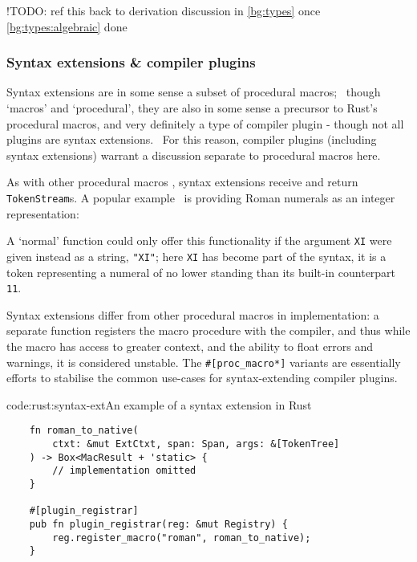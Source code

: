 !TODO: ref this back to derivation discussion in \cref{bg:types} once \cref{bg:types:algebraic} done

\subsubsection{Syntax extensions \& compiler plugins} \label{bg:rust:plugins}

Syntax extensions are in some sense a subset of procedural macros;~ \cite{rust_macros_whereweat} though `macros' and `procedural', they are also in some sense a precursor to Rust's procedural macros, and very definitely a type of compiler plugin - though not all plugins are syntax extensions.~\cite{rust_macros_overview} For this reason, compiler plugins (including syntax extensions) warrant a discussion separate to procedural macros here.

As with other procedural macros , syntax extensions receive and return \texttt{TokenStream}s. A popular example~\cite{rust_macros_overview, rust_book} is providing Roman numerals as an integer representation: 

A `normal' function could only offer this functionality if the argument \texttt{XI} were given instead as a string, \texttt{"XI"}; here \texttt{XI} has become part of the syntax, it is a token representing a numeral of no lower standing than its built-in counterpart \texttt{11}.

Syntax extensions differ from other procedural macros in implementation: 
a separate function registers the macro procedure with the compiler, and thus while the macro has access to greater context, and the ability to float errors and warnings, it is considered unstable. The \texttt{#[proc_macro*]} variants are essentially efforts to stabilise the common use-cases for syntax-extending compiler plugins. \cite{rust_macros_overview, rust_book}

\begin{codelisting}{code:rust:syntax-ext}{An example of a syntax extension in Rust}
\begin{spacing}{\codespacing}
\begin{verbatim}
    fn roman_to_native(
        ctxt: &mut ExtCtxt, span: Span, args: &[TokenTree]
    ) -> Box<MacResult + 'static> {
        // implementation omitted
    }

    #[plugin_registrar]
    pub fn plugin_registrar(reg: &mut Registry) {
        reg.register_macro("roman", roman_to_native);
    }
\end{verbatim}
\end{spacing}
\end{codelisting} 

